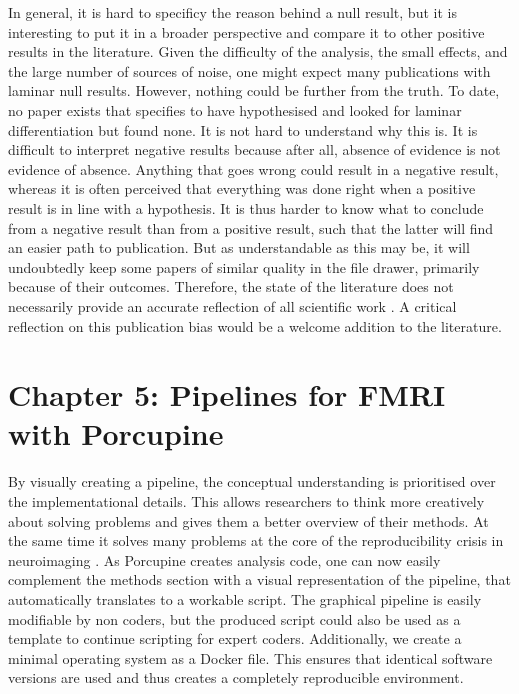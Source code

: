 In general, it is hard to specificy the reason behind a null result, but it is interesting to put it in a broader perspective and compare it to other positive results in the literature. Given the difficulty of the analysis, the small effects, and the large number of sources of noise, one might expect many publications with laminar null results. However, nothing could be further from the truth. To date, no paper exists that specifies to have hypothesised and looked for laminar differentiation but found none. 
It is not hard to understand why this is. It is difficult to interpret negative results because after all, absence of evidence is not evidence of absence. Anything that goes wrong could result in a negative result, whereas it is often perceived that everything was done right when a positive result is in line with a hypothesis. It is thus harder to know what to conclude from a negative result than from a positive result, such that the latter will find an easier path to publication. But as understandable as this may be, it will undoubtedly keep some papers of similar quality in the file drawer, primarily because of their outcomes. Therefore, the state of the literature does not necessarily provide an accurate reflection of all scientific work \cite{Ioannidis2005,Button2013}. A critical reflection on this publication bias would be a welcome addition to the literature.

\section*{Chapter 5: Pipelines for FMRI with Porcupine}
By visually creating a pipeline, the conceptual understanding is prioritised over the implementational details. This allows researchers to think more creatively about solving problems and gives them a better overview of their methods. At the same time it solves many problems at the core of the reproducibility crisis in neuroimaging \cite{Nature2017,...}. As Porcupine creates analysis code, one can now easily complement the methods section with a visual representation of the pipeline, that automatically translates to a workable script. The graphical pipeline is easily modifiable by non coders, but the produced script could also be used as a template to continue scripting for expert coders. Additionally, we create a minimal operating system as a Docker file. This ensures that identical software versions are used and thus creates a completely reproducible environment.

